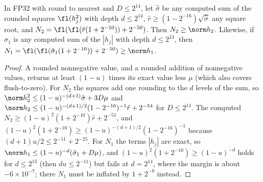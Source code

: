 \begin{lemma}\label{lem:norms}
In FP32 with round to nearest and $D\le2^{14}$, let $\hat\sigma$ be any computed sum of the rounded squares $\fl(h_j^2)$ with depth $d\le2^{14}$, $\hat r\ge(1-2^{-16})\sqrt{\hat\sigma}$ any square root, and $N_2=\fl(\fl(\hat r(1+2^{-10}))+2^{-50})$. Then $N_2\ge\norm h_2$. Likewise, if $\hat\sigma_1$ is any computed sum of the $|h_j|$ with depth $d\le2^{13}$, then $N_1=\fl(\fl(\hat\sigma_1(1+2^{-10}))+2^{-50})\ge\norm h_1$.
\end{lemma}
\begin{proof}
A rounded nonnegative value, and a rounded addition of nonnegative values, returns at least $(1-u)$ times its exact value less $\mu$ (which also covers flush-to-zero). For $N_2$ the squares add one rounding to the $d$ levels of the sum, so $\norm h_2^2\le(1-u)^{-(d+1)}\hat\sigma+3D\mu$ and $\norm h_2\le(1-u)^{-(d+1)/2}(1-2^{-16})^{-1}\hat r+2^{-54}$ for $D\le2^{14}$. The computed $N_2\ge(1-u)^2(1+2^{-10})\hat r+2^{-51}$, and $(1-u)^2(1+2^{-10})\ge(1-u)^{-(d+1)/2}(1-2^{-16})^{-1}$ because $(d+1)u/2\le2^{-11}+2^{-25}$. For $N_1$ the terms $|h_j|$ are exact, so $\norm h_1\le(1-u)^{-d}(\hat\sigma_1+D\mu)$, and $(1-u)^2(1+2^{-10})\ge(1-u)^{-d}$ holds for $d\le2^{13}$ (then $du\le2^{-11}$) but fails at $d=2^{14}$, where the margin is about $-6\times10^{-7}$; there $N_1$ must be inflated by $1+2^{-9}$ instead.
\end{proof}

